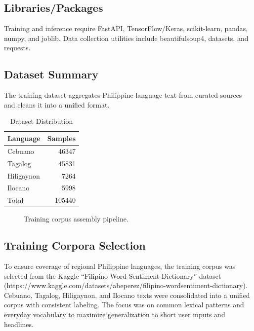 \documentclass[conference]{IEEEtran}
\begin{document}
\subsection{Libraries/Packages}
Training and inference require FastAPI, TensorFlow/Keras, scikit-learn, pandas, numpy, and joblib. Data collection utilities include beautifulsoup4, datasets, and requests.

\subsection{Dataset Summary}
The training dataset aggregates Philippine language text from curated sources and cleans it into a unified format.
\begin{table}[htbp]
\caption{Dataset Distribution}
\label{tab:dataset}
\centering
\begin{tabular}{lr}
\hline
\textbf{Language} & \textbf{Samples} \\
\hline
Cebuano & 46347 \\
Tagalog & 45831 \\
Hiligaynon & 7264 \\
Ilocano & 5998 \\
\hline
Total & 105440 \\
\hline
\end{tabular}
\end{table}

\begin{figure}[htbp]
\centering
{}
\caption{Training corpus assembly pipeline.}
\label{fig:corpus-flow}
\end{figure}

\subsection{Training Corpora Selection}
To ensure coverage of regional Philippine languages, the training corpus was selected from the Kaggle ``Filipino Word-Sentiment Dictionary'' dataset (https://www.kaggle.com/datasets/abeperez/filipino-wordsentiment-dictionary). Cebuano, Tagalog, Hiligaynon, and Ilocano texts were consolidated into a unified corpus with consistent labeling. The focus was on common lexical patterns and everyday vocabulary to maximize generalization to short user inputs and headlines.
\end{document}
